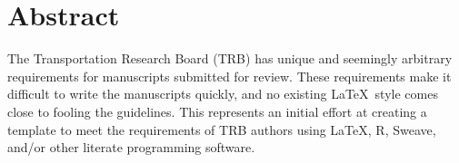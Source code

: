 \section{Abstract}

The Transportation Research Board (TRB) has unique and seemingly arbitrary
requirements for manuscripts submitted for review. These requirements make it
difficult to write the manuscripts quickly, and no existing \LaTeX\ style comes
close to fooling the guidelines. This represents an initial effort at creating
a template to meet the requirements of TRB authors using \LaTeX, R, Sweave,
and/or other literate programming software.
